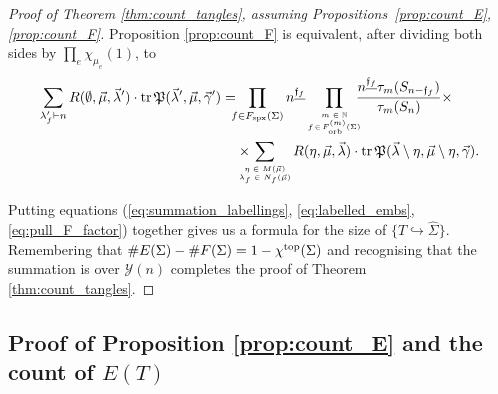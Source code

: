 \documentclass{amsart}
\newcommand{\Fspx}{F_{\textnormal{spx}}}
\newcommand{\Forb}[1][m]{F^{(#1)}_{\textnormal{orb}}}
\newcommand{\iterorb}{{\tiny\begin{matrix}m\in\mathbb{N}\\f\!\in\!\Forb(\Sigma)\end{matrix}}}
\newcommand{\tn}{\textnormal}
\newcommand{\tr}{\operatorname{tr}}
\newcommand{\whS}{{\widehat{\Sigma}}}
\begin{document}
\begin{proof}[Proof of Theorem \ref{thm:count_tangles}, assuming Propositions~\ref{prop:count_E},\ref{prop:count_F}]
Proposition \ref{prop:count_F} is equivalent, after dividing both sides by $\prod_e\chi_{\mu_e}(1)$, to
\begin{align}\begin{split}\label{eq:pull_F_factor}
\sum_{\lambda'_f\vdash n}R(\emptyset,\vec\mu,\vec\lambda')\cdot\tr\mathfrak{P}(\vec\lambda',\vec\mu,\vec\gamma')=&\hspace*{-5pt}\prod_{f\in\Fspx(\Sigma)}n^{\underline{\mathfrak{f}_f}}\prod_\iterorb\hspace*{-5pt}\frac{n^{\underline{\mathfrak{f}_f}}\tau_m(S_{n-\mathfrak{f}_f})}{\tau_m(S_n)}\times\\
&\times\hspace*{-10pt}\sum_{\tiny\begin{matrix}\eta\in M(\vec\mu)\\\lambda_f\in N_f(\vec\mu)\end{matrix}}R(\eta,\vec\mu,\vec\lambda)\cdot\tr\mathfrak{P}(\vec\lambda\setminus\eta,\vec\mu\setminus\eta,\vec\gamma).
\end{split}\end{align}

Putting equations (\ref{eq:summation_labellings}, \ref{eq:labelled_embs}, \ref{eq:pull_F_factor}) together gives us a formula for the size of $\{T\hookrightarrow\whS\}$. Remembering that $\#E(\Sigma)-\#F(\Sigma)=1-\chi^\tn{top}(\Sigma)$ and recognising that the summation is over $\mathcal{Y}(n)$ completes the proof of Theorem \ref{thm:count_tangles}.
\end{proof}

\subsection{Proof of Proposition \ref{prop:count_E} and the count of $E(T)$}\label{ssec:pf_E}
\end{document}
